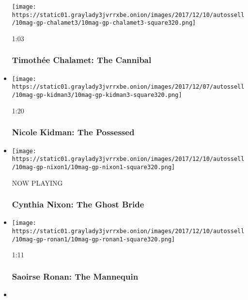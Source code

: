 \begin{itemize}
  \texttt{[image: https://static01.graylady3jvrrxbe.onion/images/2017/12/10/autossell/10mag-gp-chalamet3/10mag-gp-chalamet3-square320.png]}

  1:03

  \hypertarget{timotheux301e-chalamet-the-cannibal}{%
  \subsubsection{Timothée Chalamet: The
  Cannibal}\label{timotheux301e-chalamet-the-cannibal}}
\item
  \href{https://www.nytimes3xbfgragh.onion/video/magazine/100000005588835/nicole-kidman-the-possessed.html?action=click\&module=video-series-bar\&region=header\&pgtype=Article\&playlistId=video/great-performers}{}

  \texttt{[image: https://static01.graylady3jvrrxbe.onion/images/2017/12/07/autossell/10mag-gp-kidman3/10mag-gp-kidman3-square320.png]}

  1:20

  \hypertarget{nicole-kidman-the-possessed}{%
  \subsubsection{Nicole Kidman: The
  Possessed}\label{nicole-kidman-the-possessed}}
\item
  \texttt{[image: https://static01.graylady3jvrrxbe.onion/images/2017/12/10/autossell/10mag-gp-nixon1/10mag-gp-nixon1-square320.png]}

  NOW PLAYING

  \hypertarget{cynthia-nixon-the-ghost-bride-1}{%
  \subsubsection{Cynthia Nixon: The Ghost
  Bride}\label{cynthia-nixon-the-ghost-bride-1}}
\item
  \href{https://www.nytimes3xbfgragh.onion/video/magazine/100000005588911/the-mannequin.html?action=click\&module=video-series-bar\&region=header\&pgtype=Article\&playlistId=video/great-performers}{}

  \texttt{[image: https://static01.graylady3jvrrxbe.onion/images/2017/12/10/autossell/10mag-gp-ronan1/10mag-gp-ronan1-square320.png]}

  1:11

  \hypertarget{saoirse-ronan-the-mannequin}{%
  \subsubsection{Saoirse Ronan: The
  Mannequin}\label{saoirse-ronan-the-mannequin}}
\item
  \href{https://www.nytimes3xbfgragh.onion/video/magazine/100000005588930/daniela-vega-the-vampire.html?action=click\&module=video-series-bar\&region=header\&pgtype=Article\&playlistId=video/great-performers}{}


\end{itemize}
